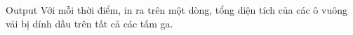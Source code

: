 Output
Với mỗi thời điểm, in ra trên một dòng, tổng diện tích của các ô vuông vải bị dính dầu trên tất cả các tấm ga.